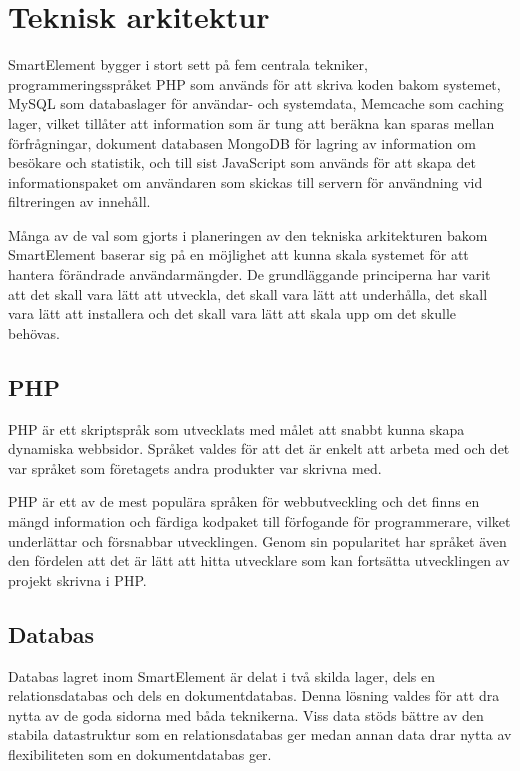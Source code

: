 \section{Teknisk arkitektur}

SmartElement bygger i stort sett på fem centrala tekniker, programmeringsspråket PHP som används för att skriva koden bakom systemet, MySQL som databaslager för användar- och systemdata, Memcache som caching lager, vilket tillåter att information som är tung att beräkna kan sparas mellan förfrågningar, dokument databasen MongoDB för lagring av information om besökare och statistik, och till sist JavaScript som används för att skapa det informationspaket om användaren som skickas till servern för användning vid filtreringen av innehåll.

Många av de val som gjorts i planeringen av den tekniska arkitekturen bakom SmartElement baserar sig på en möjlighet att kunna skala systemet för att hantera förändrade användarmängder. De grundläggande principerna har varit att det skall vara lätt att utveckla, det skall vara lätt att underhålla, det skall vara lätt att installera och det skall vara lätt att skala upp om det skulle behövas.

\subsection{PHP}

PHP är ett skriptspråk som utvecklats med målet att snabbt kunna skapa dynamiska webbsidor. \citep{phpmanual} Språket valdes för att det är enkelt att arbeta med och det var språket som företagets andra produkter var skrivna med.

PHP är ett av de mest populära språken för webbutveckling \citep{tiobe} och det finns en mängd information och färdiga kodpaket till förfogande för programmerare, vilket underlättar och försnabbar utvecklingen. Genom sin popularitet har språket även den fördelen att det är lätt att hitta utvecklare som kan fortsätta utvecklingen av projekt skrivna i PHP.

\subsection{Databas}

Databas lagret inom SmartElement är delat i två skilda lager, dels en relationsdatabas och dels en dokumentdatabas. Denna lösning valdes för att dra nytta av de goda sidorna med båda teknikerna. Viss data stöds bättre av den stabila datastruktur som en relationsdatabas ger medan annan data drar nytta av flexibiliteten som en dokumentdatabas ger.

